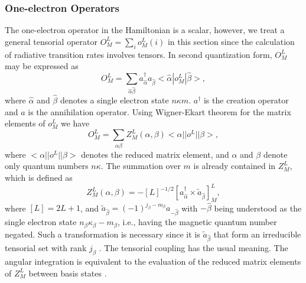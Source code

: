 \documentclass[preprint, floatfix, pra, showpacs, showkeys]{revtex4}
\begin{document}
\subsubsection{One-electron Operators}
The one-electron operator in the Hamiltonian is a scalar, however, we treat a
general tensorial operator $O^L_M = \sum_i o^L_M(i)$ in this section since the
calculation of 
radiative transition rates involves tensors. In second quantization form,
$O^L_M$ may be expressed as 
\begin{equation}
O^L_M = \sum_{\hat{\alpha}\hat{\beta}} a^{\dagger}_{\hat{\alpha}} 
a_{\hat{\beta}} <\hat{\alpha}|o^L_M|\hat{\beta}>,
\end{equation}
where $\hat{\alpha}$ and $\hat{\beta}$ denotes a single electron state
$n\kappa m$.  
$a^{\dagger}$ is the creation operator and $a$ is the annihilation
operator. Using Wigner-Ekart theorem for the matrix elements of $o^L_M$ we
have
\begin{equation}
O^L_M = \sum_{\alpha\beta} Z^L_M(\alpha,\beta) 
<\alpha||o^L||\beta>,
\end{equation}
where $<\alpha||o^L||\beta>$ denotes the reduced matrix element, and
$\alpha$ and $\beta$ denote only quantum numbers $n\kappa$. The
summation over $m$ is already contained in $Z^L_M$, which is defined as
\begin{equation}
Z^L_M(\alpha,\beta) = 
-[L]^{-1/2}\left[a^{\dagger}_{\hat{\alpha}} \times
\tilde{a}_{\hat{\beta}}\right]^L_M,
\end{equation}
where $[L] = 2L+1$, and $\tilde{a}_{\hat{\beta}} = (-1)^{j_\beta -
m_\beta}a_{-\hat{\beta}}$ 
with $-\hat{\beta}$ being understood as the single electron state
$n_\beta\kappa_\beta -\!m_\beta$, i.e., having the magnetic quantum number
negated. Such a transformation is necessary   
since it is $\tilde{a}_{\hat{\beta}}$ that form an irreducible tensorial set
with rank 
$j_\beta$ \cite{judd67}. The tensorial coupling has the usual meaning. The
angular integration is equivalent to the 
evaluation of the reduced matrix elements of $Z^L_M$ between basis states
\cite{gaigalas97}.
\end{document}
